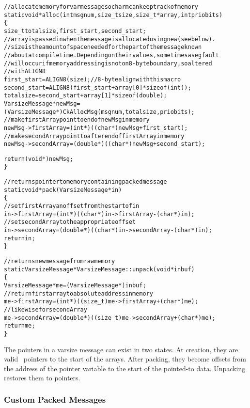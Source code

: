 \begin{alltt}
// allocate memory for varmessage so charm can keep track of memory
static void* alloc(int msgnum, size_t size, size_t* array, int priobits)
\{
  size_t totalsize, first_start, second_start;
  // array is passed in when the message is allocated using new (see below).
  // size is the amount of space needed for the part of the message known
  // about at compile time.  Depending on their values, sometimes a segfault
  // will occur if memory addressing is not on 8-byte boundary, so altered
  // with ALIGN8
  first_start = ALIGN8(size);  // 8-byte align with this macro
  second_start = ALIGN8(first_start + array[0]*sizeof(int));
  totalsize = second_start + array[1]*sizeof(double);
  VarsizeMessage* newMsg = 
    (VarsizeMessage*) CkAllocMsg(msgnum, totalsize, priobits);
  // make firstArray point to end of newMsg in memory
  newMsg->firstArray = (int*) ((char*)newMsg + first_start);
  // make secondArray point to after end of firstArray in memory
  newMsg->secondArray = (double*) ((char*)newMsg + second_start);

  return (void*) newMsg;
\}

// returns pointer to memory containing packed message
static void* pack(VarsizeMessage* in)
\{
  // set firstArray an offset from the start of in
  in->firstArray = (int*) ((char*)in->firstArray - (char*)in);
  // set secondArray to the appropriate offset
  in->secondArray = (double*) ((char*)in->secondArray - (char*)in);
  return in;
\}

// returns new message from raw memory
static VarsizeMessage* VarsizeMessage::unpack(void* inbuf)
\{
  VarsizeMessage* me = (VarsizeMessage*)inbuf;
  // return first array to absolute address in memory
  me->firstArray = (int*) ((size_t)me->firstArray + (char*)me);
  // likewise for secondArray
  me->secondArray = (double*) ((size_t)me->secondArray + (char*)me);
  return me;
\}
\end{alltt}

The pointers in a varsize message can exist in two states.  At creation, they
are valid \CC\ pointers to the start of the arrays.  After packing, they become
offsets from the address of the pointer variable to the start of the pointed-to
data.  Unpacking restores them to pointers. 

\subsubsection{Custom Packed Messages}
\label{sec:messages/packed_msgs}

